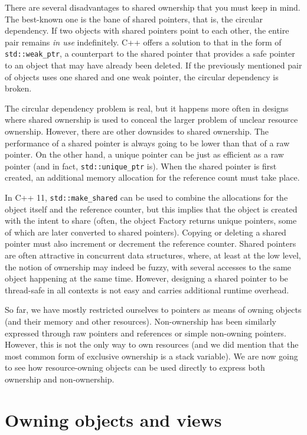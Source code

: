 There are several disadvantages to shared ownership that you must keep in mind. The best-known one is the bane of shared pointers, that is, the circular dependency. If two objects with shared pointers point to each other, the entire pair remains \emph{in use} indefinitely. C++ offers a solution to that in the form of \texttt{std::weak\_ptr}, a counterpart to the shared pointer that provides a safe pointer to an object that may have already been deleted. If the previously mentioned pair of objects uses one shared and one weak pointer, the circular dependency is broken.

The circular dependency problem is real, but it happens more often in designs where shared ownership is used to conceal the larger problem of unclear resource ownership. However, there are other downsides to shared ownership. The performance of a shared pointer is always going to be lower than that of a raw pointer. On the other hand, a unique pointer can be just as efficient as a raw pointer (and in fact, \texttt{std::unique\_ptr} is). When the shared pointer is first created, an additional memory allocation for the reference count must take place.

In C++ 11, \texttt{std::make\_shared} can be used to combine the allocations for the object itself and the reference counter, but this implies that the object is created with the intent to share (often, the object Factory returns unique pointers, some of which are later converted to shared pointers). Copying or deleting a shared pointer must also increment or decrement the reference counter. Shared pointers are often attractive in concurrent data structures, where, at least at the low level, the notion of ownership may indeed be fuzzy, with several accesses to the same object happening at the same time. However, designing a shared pointer to be thread-safe in all contexts is not easy and carries additional runtime overhead.

So far, we have mostly restricted ourselves to pointers as means of owning objects (and their memory and other resources). Non-ownership has been similarly expressed through raw pointers and references or simple non-owning pointers. However, this is not the only way to own resources (and we did mention that the most common form of exclusive ownership is a stack variable). We are now going to see how resource-owning objects can be used directly to express both ownership and non-ownership.

\section{Owning objects and views}


